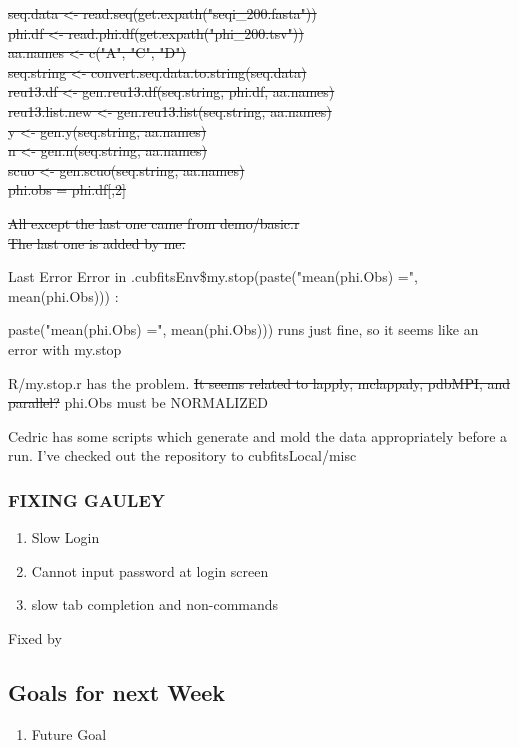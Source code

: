 \documentclass[11pt]{article} %
\begin{document}
\sout{seq.data <- read.seq(get.expath("seqi\_200.fasta"))\\
phi.df <- read.phi.df(get.expath("phi\_200.tsv"))\\
aa.names <- c("A", "C", "D")\\
seq.string <- convert.seq.data.to.string(seq.data)\\
reu13.df <- gen.reu13.df(seq.string, phi.df, aa.names)\\
reu13.list.new <- gen.reu13.list(seq.string, aa.names)\\
y <- gen.y(seq.string, aa.names)\\
n <- gen.n(seq.string, aa.names)\\
scuo <- gen.scuo(seq.string, aa.names) \\
phi.obs = phi.df[,2]}

\sout{All except the last one came from demo/basic.r\\The last one is added by me.}


Last Error
Error in .cubfitsEnv\$my.stop(paste("mean(phi.Obs) =", mean(phi.Obs))) : 

paste("mean(phi.Obs) =", mean(phi.Obs))) runs just fine, so it seems like an error with my.stop

R/my.stop.r has the problem. \sout{It seems related to lapply, mclappaly, pdbMPI, and parallel?} phi.Obs must be NORMALIZED

Cedric has some scripts which generate and mold the data appropriately before a run. I've checked out the repository to cubfitsLocal/misc




\subsubsection{FIXING GAULEY}
\begin{enumerate}
\item Slow Login
\item Cannot input password at login screen
\item slow tab completion and non-commands
\end{enumerate}

Fixed by 

\subsection{Goals for next Week}
\begin{enumerate}
\item Future Goal
\end{enumerate}
\end{document}
